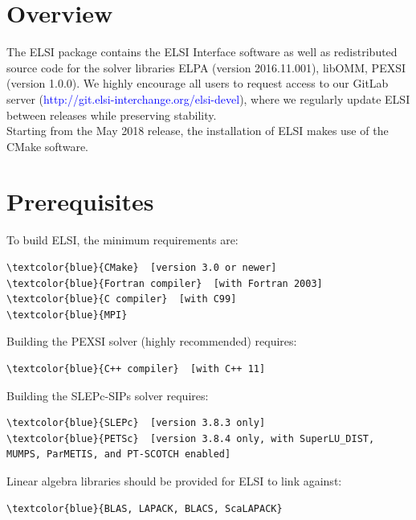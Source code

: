 \documentclass{report}
\begin{document}
\section{Overview}
\label{sec:install}
The ELSI package contains the ELSI Interface software as well as redistributed source code for the solver libraries ELPA (version 2016.11.001), libOMM, PEXSI (version 1.0.0).  We highly encourage all users to request access to our GitLab server (\textcolor{blue}{http://git.elsi-interchange.org/elsi-devel}), where we regularly update ELSI between releases while preserving stability.\\

Starting from the May 2018 release, the installation of ELSI makes use of the CMake software.\\

\section{Prerequisites}
\label{sec:prereq}
To build ELSI, the minimum requirements are:\\

\begin{Verbatim}[commandchars=\\\{\}]
\textcolor{blue}{CMake}  [version 3.0 or newer]
\textcolor{blue}{Fortran compiler}  [with Fortran 2003]
\textcolor{blue}{C compiler}  [with C99]
\textcolor{blue}{MPI}
\end{Verbatim}

Building the PEXSI solver (highly recommended) requires:\\

\begin{Verbatim}[commandchars=\\\{\}]
\textcolor{blue}{C++ compiler}  [with C++ 11]
\end{Verbatim}

Building the SLEPc-SIPs solver requires:\\

\begin{Verbatim}[commandchars=\\\{\}]
\textcolor{blue}{SLEPc}  [version 3.8.3 only]
\textcolor{blue}{PETSc}  [version 3.8.4 only, with SuperLU_DIST, MUMPS, ParMETIS, and PT-SCOTCH enabled]
\end{Verbatim}

Linear algebra libraries should be provided for ELSI to link against:\\

\begin{Verbatim}[commandchars=\\\{\}]
\textcolor{blue}{BLAS, LAPACK, BLACS, ScaLAPACK}
\end{Verbatim}
\end{document}
